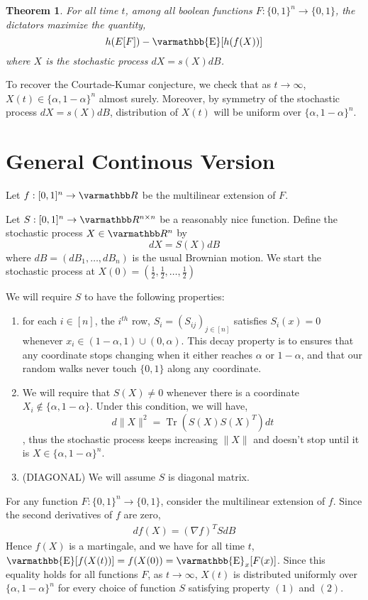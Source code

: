 \documentclass
[12pt,letterpaper]
{article}
\newtheorem{theorem}{Theorem}[section]
\theoremstyle{definition}
\theoremstyle{remark}
\let\mathbb\varmathbb
\newcommand{\norm}[1]{\lVert#1\rVert}
\newcommand{\Esymb}{\mathbb{E}}
\DeclareMathOperator*{\E}{\Esymb}
\DeclareMathOperator{\Tr}{Tr}
\newcommand{\R}{\mathbb R}
\numberwithin{equation}{section}
\begin{document}
 \begin{theorem}
	For all time $t$, among all boolean functions $F:\{0,1\}^n \to \{0,1\}$, the dictators maximize the quantity,
	\[ h(E[F]) - \E[h(f(X))]\] where $X$ is the stochastic process $dX = s(X)dB$.
 \end{theorem}

To recover the Courtade-Kumar conjecture, we check that as $t \to \infty$, $X(t) \in \{\alpha,1-\alpha\}^n$ almost surely.  Moreover, by symmetry of the stochastic process $dX = s(X) dB$, distribution of $X(t)$ will be uniform over $\{\alpha,1-\alpha\}^n$.
\fi


\iffalse
\section{General Continous Version}

Let $f: [0,1]^n \to \R$ be the multilinear extension of $F$.  

Let $S: [0,1]^n \to \R^{n \times n}$ be a reasonably nice function.  Define the stochastic process $X \in \R^n$ by
\[ dX  = S(X) dB\]
where $dB = (dB_1,\ldots,dB_n)$ is the usual Brownian motion.  We start the stochastic process at $X(0) = (\frac{1}{2},\frac{1}{2},\ldots,\frac{1}{2})$


We will require $S$ to have the following properties:  
\begin{enumerate}
\item for each $i \in [n]$, the $i^{th}$ row, $S_i = (S_{ij})_{j \in [n]}$ satisfies $S_{i}(x) = 0$ whenever $x_i \in (1-\alpha,1) \cup (0,\alpha)$.
%
This decay property is to ensures that any coordinate stops changing when it either reaches $\alpha$ or $1-\alpha$, and that our random walks never touch $\{0,1\}$ along any coordinate.

\item We will require that $S(X) \neq 0$ whenever there is a coordinate $X_i \notin \{\alpha, 1-\alpha\}$.  Under this condition, we will have,
\[ d\norm{X}^2 = \Tr(S(X) S(X)^T) dt\]
, thus the stochastic process keeps increasing $\norm{X}$ and doesn't stop until it is $X \in \{\alpha,1-\alpha\}^n$.

\item (DIAGONAL)  We will assume $S$ is diagonal matrix.
\end{enumerate}

For any function $F: \{0,1\}^n \to \{0,1\}$, consider the multilinear extension of $f$.
Since the second derivatives of $f$ are zero,
\begin{align}
	df(X) = (\nabla f)^T S dB 
\end{align}
Hence $f(X)$ is a martingale, and we have for all time $t$, $\E[f(X(t))] = f(X(0)) = \E_x [F(x)]$.  Since this equality holds for all functions $F$, as $t \to \infty$, $X(t)$ is distributed uniformly over $\{\alpha,1-\alpha\}^n$ for every choice of function $S$ satisfying property $(1)$ and $(2)$.  
\end{document}

